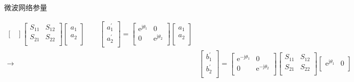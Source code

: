 \begin{frame}{微波网络参量}
\begin{enumerate}
\begin{align*}
\begin{bmatrix*}
            \end{bmatrix*}
            \begin{bmatrix*}
                S_{11} & S_{12} \\
                S_{21} & S_{22} \\
            \end{bmatrix*}
            \begin{bmatrix*}
                a_1 \\
                a_2 \\
            \end{bmatrix*}
            \qquad
            \begin{bmatrix*}
                a_1^{'} \\
                a_2^{'} \\
            \end{bmatrix*}
            =
            \begin{bmatrix*}
                \mathrm{e}^{\mathrm{j}\theta_1} & 0 \\
                0 & \mathrm{e}^{\mathrm{j}\theta_2} \\
            \end{bmatrix*}
            \begin{bmatrix*}
                a_1 \\
                a_2 \\
            \end{bmatrix*}\\
            \rightarrow
            &\begin{bmatrix*}
                b_1^{'} \\
                b_2^{'} \\
            \end{bmatrix*}
            =
            \begin{bmatrix*}
                \mathrm{e}^{-\mathrm{j}\theta_1} & 0 \\
                0 & \mathrm{e}^{-\mathrm{j}\theta_2} \\
            \end{bmatrix*}
            \begin{bmatrix*}
                S_{11} & S_{12} \\
                S_{21} & S_{22} \\
            \end{bmatrix*}
            \begin{bmatrix*}
                \mathrm{e}^{\mathrm{j}\theta_1} & 0 \\

\end{bmatrix*}
\end{align*}
\end{enumerate}
\end{frame}
